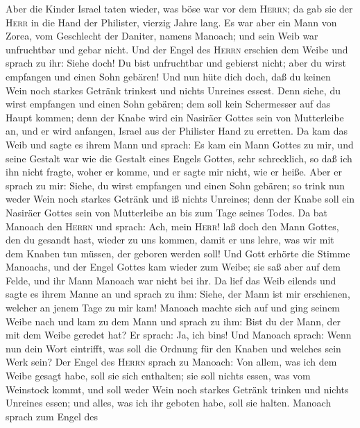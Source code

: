  Aber die Kinder Israel taten wieder, was böse war vor dem
\textsc{Herrn}; da gab sie der \textsc{Herr} in die Hand der Philister,
vierzig Jahre lang.  Es war aber ein Mann von Zorea, vom
Geschlecht der Daniter, namens Manoach; und sein Weib war unfruchtbar
und gebar nicht.  Und der Engel des \textsc{Herrn}
erschien dem Weibe und sprach zu ihr: Siehe doch! Du bist unfruchtbar
und gebierst nicht; aber du wirst empfangen und einen Sohn gebären!
 Und nun hüte dich doch, daß du keinen Wein noch starkes
Getränk trinkest und nichts Unreines essest.  Denn siehe,
du wirst empfangen und einen Sohn gebären; dem soll kein Schermesser auf
das Haupt kommen; denn der Knabe wird ein Nasiräer Gottes sein von
Mutterleibe an, und er wird anfangen, Israel aus der Philister Hand zu
erretten.  Da kam das Weib und sagte es ihrem Mann und
sprach: Es kam ein Mann Gottes zu mir, und seine Gestalt war wie die
Gestalt eines Engels Gottes, sehr schrecklich, so daß ich ihn nicht
fragte, woher er komme, und er sagte mir nicht, wie er heiße.
 Aber er sprach zu mir: Siehe, du wirst empfangen und
einen Sohn gebären; so trink nun weder Wein noch starkes Getränk und iß
nichts Unreines; denn der Knabe soll ein Nasiräer Gottes sein von
Mutterleibe an bis zum Tage seines Todes.  Da bat Manoach
den \textsc{Herrn} und sprach: Ach, mein \textsc{Herr}! laß doch den
Mann Gottes, den du gesandt hast, wieder zu uns kommen, damit er uns
lehre, was wir mit dem Knaben tun müssen, der geboren werden soll!
 Und Gott erhörte die Stimme Manoachs, und der Engel
Gottes kam wieder zum Weibe; sie saß aber auf dem Felde, und ihr Mann
Manoach war nicht bei ihr.  Da lief das Weib eilends und
sagte es ihrem Manne an und sprach zu ihm: Siehe, der Mann ist mir
erschienen, welcher an jenem Tage zu mir kam!  Manoach
machte sich auf und ging seinem Weibe nach und kam zu dem Mann und
sprach zu ihm: Bist du der Mann, der mit dem Weibe geredet hat? Er
sprach: Ja, ich bin\textquotesingle s!  Und Manoach
sprach: Wenn nun dein Wort eintrifft, was soll die Ordnung für den
Knaben und welches sein Werk sein?  Der Engel des
\textsc{Herrn} sprach zu Manoach: Von allem, was ich dem Weibe gesagt
habe, soll sie sich enthalten;  sie soll nichts essen,
was vom Weinstock kommt, und soll weder Wein noch starkes Getränk
trinken und nichts Unreines essen; und alles, was ich ihr geboten habe,
soll sie halten.  Manoach sprach zum Engel des
